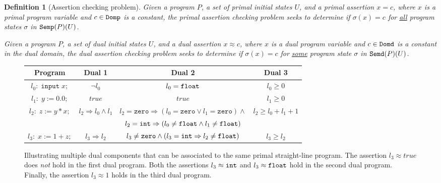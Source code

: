 \documentclass[preprint]{sig-alternate-05-2015}
\newtheorem{definition}{Definition}
\def\semp{{\tt{Semp}}}
\def\semd{{\tt{Semd}}}
\def\zero{{\tt{zero}}}
\def\float{{\tt{float}}}
\def\int{{\tt{int}}}
\def\domp{{\tt{Domp}}}
\def\domd{{\tt{Domd}}}
\def\true{{\mathit{true}}}
\def\zero{{\mathtt{zero}}}
\def\integers{{\mathtt{int}}}
\def\floats{{\mathtt{float}}}
\begin{document}
\begin{definition}[Assertion checking problem]
  Given a program $P$, 
  a set of primal initial states $U$,
  and a primal assertion $x=c$,
  where $x$ is a primal program variable and
  $c\in\domp$ is a constant,
  the {\em{primal assertion checking problem}} seeks to determine if
  $\sigma(x)=c$ for \underline{all} program states $\sigma$
  in $\semp(P)(U)$.

  Given a program $P$,
  a set of dual initial states $U$,
  and a dual assertion $x\approx c$,
  where $x$ is a dual program variable and
  $c\in\domd$ is a constant in the dual domain,
  the {\em{dual assertion checking problem}} seeks to determine if
  $\sigma(x)=c$ for \underline{some} program state $\sigma$
  in $\semd(P)(U)$.
\end{definition}

\begin{figure}[tb]
  \begin{center}
  \begin{tabular}{||c||c|c|c||}
    \hline
    Program & Dual 1 & Dual 2 & Dual 3
    \\ \hline \hline
    $l_0:\; \mathtt{input}\; x; $ & $\neg l_0$ & $l_0=\float$ & $l_0 \geq 0$ \\
            $l_1:\; y := 0.0 ;$ & $\true$ %
            & $\true$ %
            & $l_1 \geq 0$ \\
            $l_2:\; z := y*x ;$ & $l_2\Rightarrow l_0\wedge l_1$ & ${l_2=\zero\Rightarrow (l_0=\zero\vee l_1=\zero)\wedge}$ & $l_2\geq l_0+l_1+1$\\
                                  & & $l_2=\int\Rightarrow (l_0\neq\float\wedge l_1\neq\float)$ & \\[0.4ex]
           $l_3:\; x := 1 + z;$ & $l_3\Rightarrow l_2$ & ${l_3\neq\zero \wedge (l_3=\int \Rightarrow l_2\neq\float)}$ & $l_3 \geq l_2$
    \\ \hline
  \end{tabular}
\end{center}
  \caption{{\small{Illustrating multiple dual components that can be associated to the same primal straight-line program.
    The assertion $l_3 \approx \true$ does {\em{not}} hold in the first dual program.
    Both the assertions $l_3\approx\int$ and $l_3\approx\float$ hold in the second dual program.
    Finally, the assertion $l_3 \approx 1$ holds in the third dual program.
  }}}\label{fig:ex1}
\end{figure}
\end{document}
